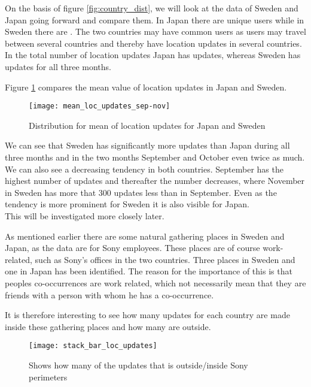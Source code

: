 On the basis of figure \ref{fig:country_dist}, we will look at the data of Sweden and Japan going forward and compare them. 
In Japan there are \numberUsersJapan{} unique users while in Sweden there are \numberUsersSweden{}. The two countries may have common users as users may travel between several countries and thereby have location updates in several countries.  
In the total number of location updates Japan has \locUpdatesJapan{} updates, whereas Sweden has \locUpdatesSweden{} updates for all three months. 

Figure \ref{fig:mean_loc_updates_sep-nov} compares the mean value of location updates in Japan and Sweden. 

\begin{figure}[H]
    \hspace*{-2.2cm}
    \centering
    \texttt{[image: mean\_loc\_updates\_sep-nov]}
    \caption{Distribution for mean of location updates for Japan and Sweden}
    \label{fig:mean_loc_updates_sep-nov}
\end{figure}


We can see that Sweden has significantly more updates than Japan during all three months and in the two months September and October even twice as much. We can also see a decreasing tendency in both countries. September has the highest number of updates and thereafter the number decreases, where November in Sweden has more that 300 updates less than in September. Even as the tendency is more prominent for Sweden it is also visible for Japan.  \\
This will be investigated more closely later.  


As mentioned earlier there are some natural gathering places in Sweden and Japan, as the data are for Sony employees. These places are of course work-related, such as Sony's offices in the two countries. Three places in Sweden and one in Japan has been identified. The reason for the importance of this is that peoples co-occurrences are work related, which not necessarily mean that they are friends with a person with whom he has a co-occurrence. 

It is therefore interesting to see how many updates for each country are made inside these gathering places and how many are outside.  

\begin{figure}[H]
    \hspace*{-2.2cm}
    \centering
    \texttt{[image: stack\_bar\_loc\_updates]}
    \caption{Shows how many of the updates that is outside/inside Sony perimeters}
    \label{fig:hq_stack_bar}
\end{figure}

